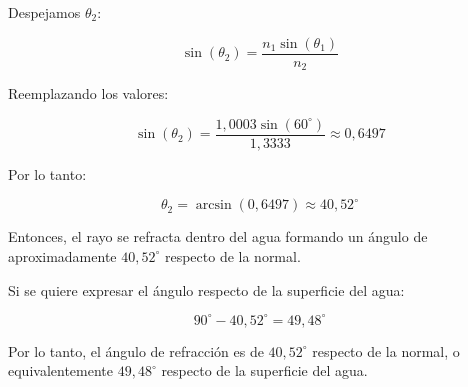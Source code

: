\documentclass[11pt,a4paper]{article}
\begin{document}
\begin{enumerate}[label=4.\arabic*), itemsep=0.3cm]
        Despejamos $\theta_2$:

        \begin{equation}
          \sin(\theta_2) =
          \frac{n_1 \sin(\theta_1)}{n_2}
        \end{equation}

        Reemplazando los valores:

        \begin{equation}
          \sin(\theta_2) =
          \frac{1{,}0003 \sin(60^\circ)}{1{,}3333}
          \approx 0{,}6497
        \end{equation}

        Por lo tanto:

        \begin{equation}
          \theta_2 = \arcsin(0{,}6497) \approx 40{,}52^\circ
        \end{equation}

        Entonces, el rayo se refracta dentro del agua formando un ángulo de aproximadamente $40{,}52^\circ$ respecto de la normal.

        Si se quiere expresar el ángulo respecto de la superficie del agua:

        \begin{equation}
          90^\circ - 40{,}52^\circ = 49{,}48^\circ
        \end{equation}

        Por lo tanto, el ángulo de refracción es de $40{,}52^\circ$ respecto de la normal, o equivalentemente $49{,}48^\circ$ respecto de la superficie del agua.


\end{enumerate}
\end{document}
